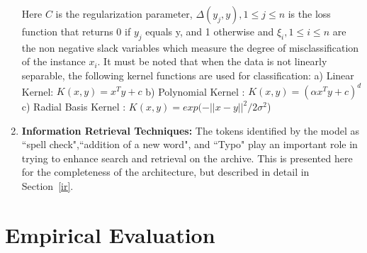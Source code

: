\documentclass[letterpaper]{article}
\begin{document}
\begin{enumerate}
Here $C$ is the regularization parameter, $\Delta(y_{j},y), 1 \le j \le n$ is the loss function that returns 0 if $y_{j}$ equals y, and 1 otherwise and $\xi_{i}, 1 \le i \le n$ are the non negative slack variables which measure the degree of misclassification of the instance $x_{i}$. 
It must be noted that when the data is not linearly separable, the following kernel functions are used for classification:
a) Linear Kernel: $K(x,y) = x^{T}y + c $
b) Polynomial Kernel : $K(x,y) = (\alpha x^{T}y + c)^{d}$
c) Radial Basis Kernel : $K(x,y) = exp(-\lvert \lvert x-y\rvert\rvert^{2}/2\sigma^{2}$)

%
\item \textbf{Information Retrieval Techniques: } The tokens identified by the model as ``spell check",``addition of a new word", and ``Typo" play an important role in trying to enhance search and retrieval on the archive. This is presented here for the completeness of the architecture, but described in detail in Section~\ref{ir}.




\end{enumerate}

\section{Empirical Evaluation}
\label{sec:evaluation}
\end{document}

